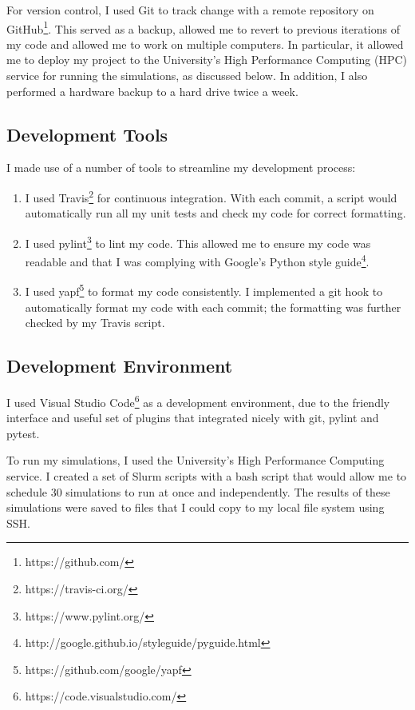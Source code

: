 \documentclass[12pt,a4paper,twoside,openright]{report}
\begin{document}
For version control, I used Git to track change with a remote repository on GitHub\footnote{https://github.com/}. This served as a backup, allowed me to revert to previous iterations of my code and allowed me to work on multiple computers. In particular, it allowed me to deploy my project to the University's High Performance Computing (HPC) service for running the simulations, as discussed below. In addition, I also performed a hardware backup to a hard drive twice a week.

\subsection{Development Tools}

I made use of a number of tools to streamline my development process:

\begin{enumerate}
	\item I used Travis\footnote{https://travis-ci.org/} for continuous integration. With each commit, a script would automatically run all my unit tests and check my code for correct formatting.
	\item I used pylint\footnote{https://www.pylint.org/} to lint my code. This allowed me to ensure my code was readable and that I was complying with Google's Python style guide\footnote{http://google.github.io/styleguide/pyguide.html}.
	\item I used yapf\footnote{https://github.com/google/yapf} to format my code consistently. I implemented a git hook to automatically format my code with each commit; the formatting was further checked by my Travis script.
\end{enumerate}

\subsection{Development Environment}

I used Visual Studio Code\footnote{https://code.visualstudio.com/} as a development environment, due to the friendly interface and useful set of plugins that integrated nicely with git, pylint and pytest. 

To run my simulations, I used the University's High Performance Computing service. I created a set of Slurm scripts with a bash script that would allow me to schedule 30 simulations to run at once and independently. The results of these simulations were saved to files that I could copy to my local file system using SSH.
\end{document}
